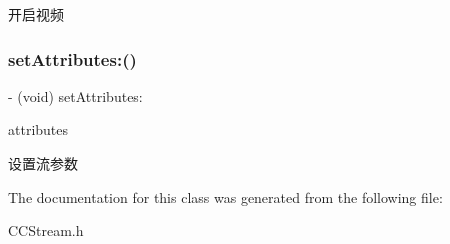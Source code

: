 开启视频 \mbox{\label{interface_c_c_stream_a3643903f78ac8220b16b926f779dfab4}} 
\subsubsection{\texorpdfstring{set\+Attributes\+:()}{setAttributes:()}}
{\footnotesize\ttfamily -\/ (void) set\+Attributes\+: \begin{DoxyParamCaption}\item[{(N\+S\+Dictionary$<$ N\+S\+String $\ast$, N\+S\+String $\ast$ $>$ $\ast$)}]{attributes }\end{DoxyParamCaption}}

设置流参数 

The documentation for this class was generated from the following file\+:\begin{DoxyCompactItemize}
\item 
C\+C\+Stream.\+h\end{DoxyCompactItemize}
